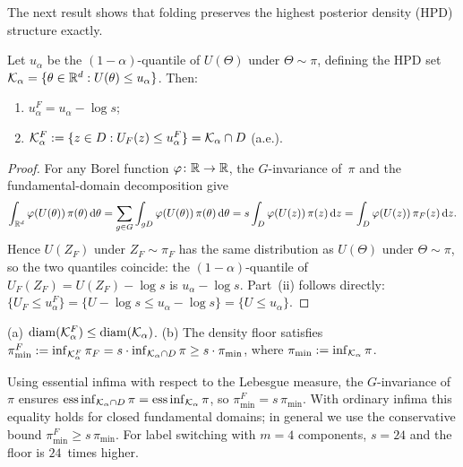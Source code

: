 The next result shows that folding preserves the highest posterior
density (HPD) structure exactly.

\begin{proposition}\label{prop:hpd}
  Let $u_\alpha$ be the $(1{-}\alpha)$-quantile of $U(\Theta)$ under
  $\Theta \sim \pi$, defining the HPD set
  $\mathcal{K}_\alpha = \{\theta \in \mathbb{R}^d : U(\theta) \leq u_\alpha\}$.
  Then:
  \begin{enumerate}[nosep]
    \item $u_\alpha^F = u_\alpha - \log s$;
    \item $\mathcal{K}_\alpha^F
      := \{z \in D : U_F(z) \leq u_\alpha^F\}
      = \mathcal{K}_\alpha \cap D$ \;(a.e.).
  \end{enumerate}
\end{proposition}

\begin{proof}
  For any Borel function $\varphi\colon \mathbb{R} \to \mathbb{R}$, the $G$-invariance
  of~$\pi$ and the fundamental-domain decomposition give
  \[
    \int_{\mathbb{R}^d} \varphi(U(\theta))\,\pi(\theta)\,\mathrm{d}\theta
    = \sum_{g \in G} \int_{gD} \varphi(U(\theta))\,\pi(\theta)\,\mathrm{d}\theta
    = s \int_D \varphi(U(z))\,\pi(z)\,\mathrm{d}z
    = \int_D \varphi(U(z))\,\pi_F(z)\,\mathrm{d}z.
  \]
  Hence $U(Z_F)$ under $Z_F \sim \pi_F$ has the same distribution as
  $U(\Theta)$ under $\Theta \sim \pi$, so the two quantiles coincide:
  the $(1{-}\alpha)$-quantile of $U_F(Z_F) = U(Z_F) - \log s$
  is $u_\alpha - \log s$.
  Part~(ii) follows directly:
  $\{U_F \leq u_\alpha^F\} = \{U - \log s \leq u_\alpha - \log s\}
  = \{U \leq u_\alpha\}$.
\end{proof}

\begin{corollary}\label{cor:hpd_geometry}
  (a) $\mathrm{diam}(\mathcal{K}_\alpha^F) \leq \mathrm{diam}(\mathcal{K}_\alpha)$.
  (b) The density floor satisfies
  $\pi_{\min}^F := \inf_{\mathcal{K}_\alpha^F} \pi_F
  = s \cdot \inf_{\mathcal{K}_\alpha \cap D} \pi \geq s \cdot \pi_{\min}$,
  where $\pi_{\min} := \inf_{\mathcal{K}_\alpha} \pi$.
\end{corollary}

\noindent
Using essential infima with respect to the Lebesgue measure,
the $G$-invariance of~$\pi$ ensures
$\operatorname{ess\,inf}_{\mathcal{K}_\alpha \cap D} \pi
= \operatorname{ess\,inf}_{\mathcal{K}_\alpha} \pi$,
so $\pi_{\min}^F = s\,\pi_{\min}$.  With ordinary infima this
equality holds for closed fundamental domains; in general we use
the conservative bound $\pi_{\min}^F \geq s\,\pi_{\min}$.
For label switching with $m = 4$ components, $s = 24$ and the
floor is $24$~times higher.


